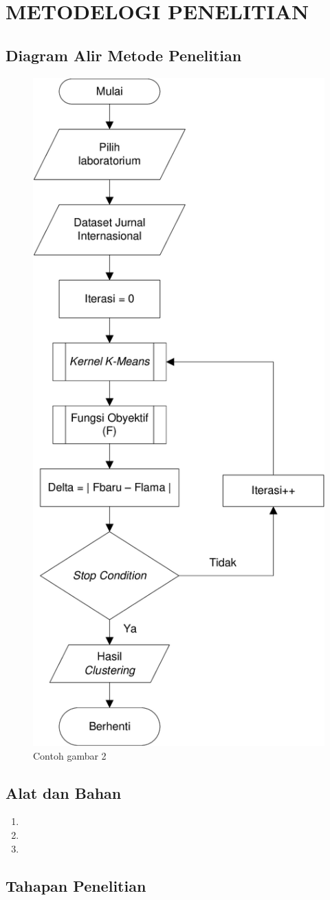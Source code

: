 \chapter[METODOLOGI PENELITIAN]{\\ METODELOGI PENELITIAN}

\section{Diagram Alir Metode Penelitian}
\lipsum[2]

\begin{figure}[H]
    \centering
    \includegraphics[width=0.40\linewidth]{gambar/flowchart.png}
    \caption{Contoh gambar 2}
    \label{gambar2}
\end{figure}

\section{Alat dan Bahan}
\lipsum[2][4]

\begin{enumerate}
    \item \lipsum[2][5]
    \item \lipsum[2][5]
    \item \lipsum[2][5]
\end{enumerate}

\section{Tahapan Penelitian}
\lipsum[2][4]

